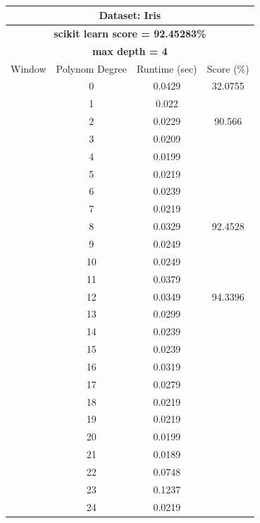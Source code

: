 \documentclass{article}
\begin{document}
\begin{multicols}{2}
\begin{table}[H]
\caption{}
\label{tab:my-table}
\begin{tabular}{|c|c|c|c|}
\hline
\multicolumn{4}{|c|}{\textbf{Dataset: Iris}} \\ \hline
\multicolumn{4}{|c|}{\textbf{scikit learn score = 92.45283\%}} \\ \hline
\multicolumn{4}{|c|}{\textbf{max depth = 4}} \\ \hline
Window & Polynom Degree & Runtime (sec) & Score (\%) \\ \hline
 & 0 & 0.0429 & 32.0755 \\ \cline{2-4} 
 & 1 & 0.022 &  \\ \cline{2-3}
 & 2 & 0.0229 & \multirow{-2}{*}{90.566} \\ \cline{2-4} 
 & 3 & 0.0209 &  \\ \cline{2-3}
 & 4 & 0.0199 &  \\ \cline{2-3}
 & 5 & 0.0219 &  \\ \cline{2-3}
 & 6 & 0.0239 &  \\ \cline{2-3}
 & 7 & 0.0219 &  \\ \cline{2-3}
 & 8 & 0.0329 & \multirow{-6}{*}{92.4528} \\ \cline{2-4} 
 & \cellcolor[HTML]{FFFFC7}9 & \cellcolor[HTML]{FFFFC7}0.0249 & \cellcolor[HTML]{FFFFC7} \\ \cline{2-3}
 & 10 & 0.0249 & \cellcolor[HTML]{FFFFC7} \\ \cline{2-3}
 & 11 & 0.0379 & \cellcolor[HTML]{FFFFC7} \\ \cline{2-3}
 & 12 & 0.0349 & \multirow{-4}{*}{\cellcolor[HTML]{FFFFC7}94.3396} \\ \cline{2-4} 
 & 13 & 0.0299 &  \\ \cline{2-3}
 & 14 & 0.0239 &  \\ \cline{2-3}
 & 15 & 0.0239 &  \\ \cline{2-3}
 & 16 & 0.0319 &  \\ \cline{2-3}
 & 17 & 0.0279 &  \\ \cline{2-3}
 & 18 & 0.0219 &  \\ \cline{2-3}
 & 19 & 0.0219 &  \\ \cline{2-3}
 & 20 & 0.0199 &  \\ \cline{2-3}
 & 21 & 0.0189 &  \\ \cline{2-3}
 & 22 & 0.0748 &  \\ \cline{2-3}
 & 23 & 0.1237 &  \\ \cline{2-3}
 & 24 & 0.0219 &  \\ \cline{2-3}

\end{tabular}
\end{table}
\end{multicols}
\end{document}
